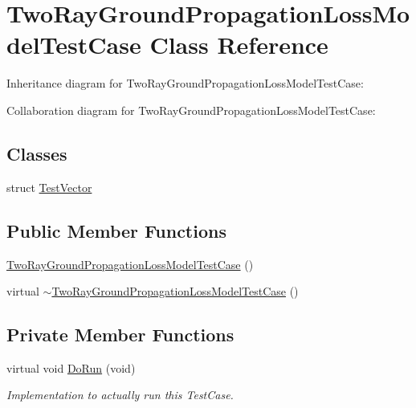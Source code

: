 \hypertarget{classTwoRayGroundPropagationLossModelTestCase}{}\section{Two\+Ray\+Ground\+Propagation\+Loss\+Model\+Test\+Case Class Reference}
\label{classTwoRayGroundPropagationLossModelTestCase}


Inheritance diagram for Two\+Ray\+Ground\+Propagation\+Loss\+Model\+Test\+Case\+:


Collaboration diagram for Two\+Ray\+Ground\+Propagation\+Loss\+Model\+Test\+Case\+:
\subsection*{Classes}
\begin{DoxyCompactItemize}
\item 
struct \hyperlink{structTwoRayGroundPropagationLossModelTestCase_1_1TestVector}{Test\+Vector}
\end{DoxyCompactItemize}
\subsection*{Public Member Functions}
\begin{DoxyCompactItemize}
\item 
\hyperlink{classTwoRayGroundPropagationLossModelTestCase_a302c675daa97f94efd182a21b3e44340}{Two\+Ray\+Ground\+Propagation\+Loss\+Model\+Test\+Case} ()
\item 
virtual \hyperlink{classTwoRayGroundPropagationLossModelTestCase_aa46a29927dfa161626f700824c248572}{$\sim$\+Two\+Ray\+Ground\+Propagation\+Loss\+Model\+Test\+Case} ()
\end{DoxyCompactItemize}
\subsection*{Private Member Functions}
\begin{DoxyCompactItemize}
\item 
virtual void \hyperlink{classTwoRayGroundPropagationLossModelTestCase_ab9c944227a539d51afe1bcd969c6dfd6}{Do\+Run} (void)
\begin{DoxyCompactList}\small\item\em Implementation to actually run this Test\+Case. \end{DoxyCompactList}\end{DoxyCompactItemize}
